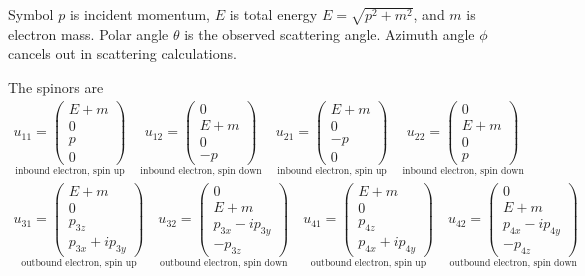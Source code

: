 \documentclass[12pt]{article}
\begin{document}
\noindent
Symbol $p$ is incident momentum,
$E$ is total energy $E=\sqrt{p^2+m^2}$,
and $m$ is electron mass.
Polar angle $\theta$ is the observed scattering angle.
Azimuth angle $\phi$ cancels out in scattering calculations.

\bigskip
\noindent
The spinors are
\begin{gather*}
\underset{\text{inbound electron, spin up}}
{u_{11}=\begin{pmatrix}E+m\\0\\p\\0\end{pmatrix}}
\quad
\underset{\text{inbound electron, spin down}}
{u_{12}=\begin{pmatrix}0\\E+m\\0\\-p\end{pmatrix}}
\quad
\underset{\text{inbound electron, spin up}}
{u_{21}=\begin{pmatrix}E+m\\0\\-p\\0\end{pmatrix}}
\quad
\underset{\text{inbound electron, spin down}}
{u_{22}=\begin{pmatrix}0\\E+m\\0\\p\end{pmatrix}}
\\
\underset{\text{outbound electron, spin up}}
{u_{31}=\begin{pmatrix}E+m\\0\\p_{3z}\\p_{3x}+ip_{3y}\end{pmatrix}}
\quad
\underset{\text{outbound electron, spin down}}
{u_{32}=\begin{pmatrix}0\\E+m\\p_{3x}-ip_{3y}\\-p_{3z}\end{pmatrix}}
\quad
\underset{\text{outbound electron, spin up}}
{u_{41}=\begin{pmatrix}E+m\\0\\p_{4z}\\p_{4x}+ip_{4y}\end{pmatrix}}
\quad
\underset{\text{outbound electron, spin down}}
{u_{42}=\begin{pmatrix}0\\E+m\\p_{4x}-ip_{4y}\\-p_{4z}\end{pmatrix}}
\end{gather*}
\end{document}
